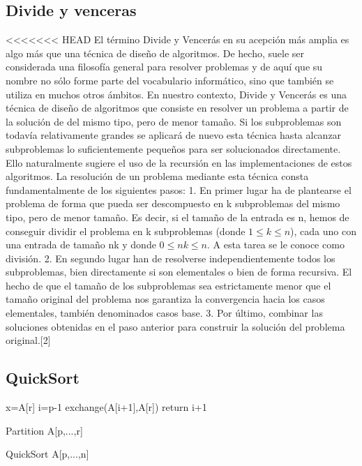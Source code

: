 \documentclass[spanish]{article}
\begin{document}
	\subsection{Divide y venceras}	
<<<<<<< HEAD
	El  término  Divide  y  Vencerás  en  su  acepción  más  amplia  es  algo  más  que  una  técnica  de  diseño  de  algoritmos.  De  hecho,  suele  ser  considerada  una  filosofía  general  para  resolver  problemas  y  de  aquí  que  su  nombre  no  sólo  forme  parte  del  vocabulario informático, sino que también se utiliza en muchos otros ámbitos.      En nuestro contexto, Divide y Vencerás es una técnica de diseño de algoritmos que  consiste  en  resolver  un  problema  a  partir  de  la  solución  de    del  mismo tipo, pero de menor tamaño. Si los subproblemas son todavía relativamente grandes   se   aplicará   de   nuevo   esta   técnica   hasta   alcanzar   subproblemas   lo   suficientemente  pequeños  para  ser  solucionados  directamente.  Ello  naturalmente  sugiere el uso de la recursión en las implementaciones de estos algoritmos.       La  resolución  de  un  problema  mediante  esta  técnica  consta  fundamentalmente  de los siguientes pasos: 1.   En   primer   lugar   ha   de   plantearse   el   problema   de   forma   que   pueda   ser   descompuesto  en  k  subproblemas  del  mismo  tipo,  pero  de  menor  tamaño.  Es  decir, si el tamaño de la entrada es n, hemos de conseguir dividir el problema en k  subproblemas  (donde  $1\leq k \leq n$),  cada  uno  con  una  entrada  de  tamaño  nk  y  donde $0\leq nk \leq n$. A esta tarea se le conoce como división. 2.    En    segundo    lugar    han    de    resolverse    independientemente    todos    los    subproblemas,  bien  directamente  si  son  elementales  o  bien  de  forma  recursiva.  El hecho de que el tamaño de los subproblemas sea estrictamente menor que el tamaño  original  del  problema  nos  garantiza  la  convergencia  hacia  los  casos  elementales, también denominados casos base. 3.  Por  último,  combinar las soluciones obtenidas en el paso anterior para construir la solución del problema original.[2]	
	\subsection*{QuickSort}	
	\begin{algorithm}[H]
		x=A[r]\;
		i=p-1\;
		exchange(A[i+1],A[r])\;
		return i+1\;
		\caption{Partition A[p,...,r]}
	\end{algorithm}
	\begin{algorithm}[H]
		\caption{QuickSort A[p,...,n]}
	\end{algorithm}
\end{document}
